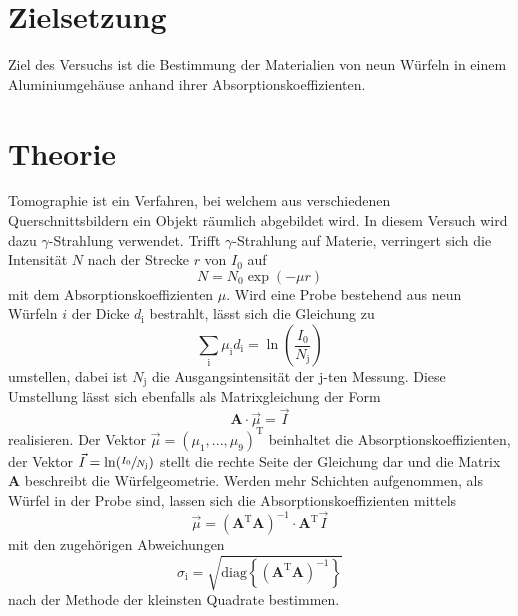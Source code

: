 \section{Zielsetzung}
\label{sec:Zielsetzung}

Ziel des Versuchs ist die Bestimmung der Materialien von neun Würfeln in einem
Aluminiumgehäuse anhand ihrer Absorptionskoeffizienten.

\section{Theorie}
\label{sec:Theorie}

Tomographie ist ein Verfahren, bei welchem aus verschiedenen
Querschnittsbildern ein Objekt räumlich abgebildet wird. In diesem Versuch
wird dazu $\gamma$-Strahlung verwendet.
Trifft $\gamma$-Strahlung auf Materie, verringert sich die Intensität $N$
nach der Strecke $r$ von $I_0$ auf
\begin{equation*}
  N = N_0 \exp\left(-\mu r\right)
\end{equation*}
mit dem Absorptionskoeffizienten $\mu$. Wird eine Probe bestehend aus
neun Würfeln $i$ der Dicke $d_\text{i}$ bestrahlt, lässt sich
die Gleichung zu
\begin{equation*}
  \sum_\text{i} \mu_\text{i} d_\text{i} = \ln\left(\frac{I_0}{N_\text{j}}\right)
\end{equation*}
umstellen, dabei ist $N_\text{j}$ die Ausgangsintensität der j-ten Messung.
Diese Umstellung lässt sich ebenfalls als Matrixgleichung der
Form
\begin{equation}
  \mathbf{A} \cdot \vec{\mu} = \vec{I}
\end{equation}
realisieren.
Der Vektor $\vec{\mu} = (\mu_1,...,\mu_9)^\text{T}$ beinhaltet die
Absorptionskoeffizienten,
der Vektor $\vec{I} = \ln(\sfrac{I_0}{N_\text{j}})$ stellt die rechte Seite
der Gleichung dar und die Matrix $\mathbf{A}$ beschreibt die Würfelgeometrie.
Werden mehr Schichten aufgenommen, als Würfel in der Probe sind, lassen sich
die Absorptionskoeffizienten mittels
\begin{equation}
  \vec{\mu} = \left(\mathbf{A}^\text{T} \mathbf{A}\right)^{-1} \cdot
  \mathbf{A}^\text{T} \vec{I}
  \label{eqn:least-squares}
\end{equation}
mit den zugehörigen Abweichungen
\begin{equation}
  \sigma_\text{i} =
  \sqrt{\text{diag}\left\{\left(\mathbf{A}^\text{T} \mathbf{A}\right)^{-1}\right\}}
  \label{eqn:least-squares-error}
\end{equation}
nach der Methode der kleinsten Quadrate bestimmen.

